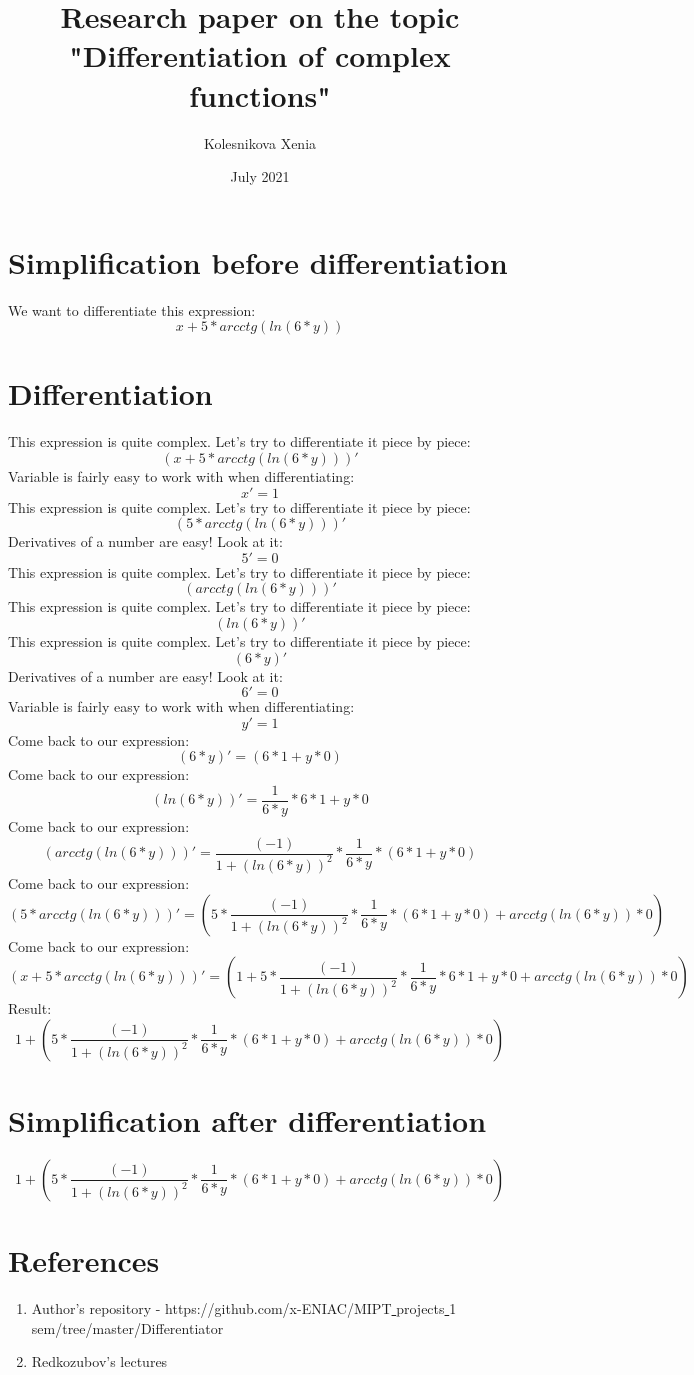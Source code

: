 \documentclass{article}
\title{Research paper on the topic "Differentiation of complex functions"}
\author{Kolesnikova Xenia}
\date{July 2021}
\begin{document}
\maketitle
\centering
\section{\Large{Simplification before differentiation}}
\centering
We want to differentiate this expression:
$$ x+5*arcctg(ln(6*y)) $$
\section{\Large{Differentiation}}
This expression is quite complex. Let's try to differentiate it piece by piece: 
$$ (x+5*arcctg(ln(6*y)))'$$
Variable is fairly easy to work with when differentiating: 
$$ x' = 1 $$
This expression is quite complex. Let's try to differentiate it piece by piece: 
$$ (5*arcctg(ln(6*y)))'$$
Derivatives of a number are easy! Look at it: 
$$ 5' = 0 $$
This expression is quite complex. Let's try to differentiate it piece by piece: 
$$ (arcctg(ln(6*y)))'$$
This expression is quite complex. Let's try to differentiate it piece by piece: 
$$ (ln(6*y))'$$
This expression is quite complex. Let's try to differentiate it piece by piece: 
$$ (6*y)'$$
Derivatives of a number are easy! Look at it: 
$$ 6' = 0 $$
Variable is fairly easy to work with when differentiating: 
$$ y' = 1 $$
Come back to our expression: 
$$ (6*y)' = 
(6*1+y*0) $$
Come back to our expression: 
$$ (ln(6*y))' = 
\frac{1}{6*y}*6*1+y*0 $$
Come back to our expression: 
$$ (arcctg(ln(6*y)))' = 
\frac{(-1)}{1+(ln(6*y))^{2}}*\frac{1}{6*y}*(6*1+y*0) $$
Come back to our expression: 
$$ (5*arcctg(ln(6*y)))' = 
(5*\frac{(-1)}{1+(ln(6*y))^{2}}*\frac{1}{6*y}*(6*1+y*0)+arcctg(ln(6*y))*0) $$
Come back to our expression: 
$$ (x+5*arcctg(ln(6*y)))' = 
(1+5*\frac{(-1)}{1+(ln(6*y))^{2}}*\frac{1}{6*y}*6*1+y*0+arcctg(ln(6*y))*0) $$
Result:
$$ 1+(5*\frac{(-1)}{1+(ln(6*y))^{2}}*\frac{1}{6*y}*(6*1+y*0)+arcctg(ln(6*y))*0) $$
\section{\Large{Simplification after differentiation}}$$ 1+(5*\frac{(-1)}{1+(ln(6*y))^{2}}*\frac{1}{6*y}*(6*1+y*0)+arcctg(ln(6*y))*0) $$
\section{\Large{References}}
\begin{enumerate} \item Author's repository - https://github.com/x-ENIAC/MIPT\underline{ }projects\underline{ }1\underline{ }sem/tree/master/Differentiator
 \item Redkozubov's lectures
\end{enumerate}
\end{document}
